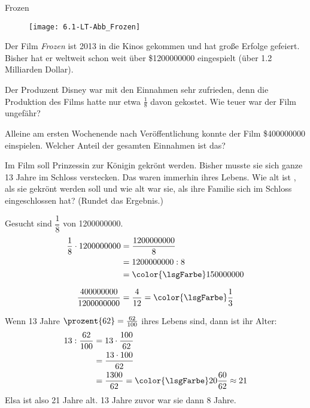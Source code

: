 \documentclass[12pt,a5paper,landscape]{scrartcl}
\def\clrLsg{\color{\lsgFarbe}}
\begin{document}
	\begin{karte3}[\symPartner]{Frozen}
		\begin{wrapfigure}[11]{r}{0pt}
			\texttt{[image: 6.1-LT-Abb\_Frozen]}
		\end{wrapfigure}
		
		Der Film \emph{Frozen} ist 2013 in die Kinos gekommen und hat große Erfolge gefeiert.
		Bisher hat er weltweit schon weit über \$\num{1200000000} eingespielt (über \num{1,2} Milliarden Dollar).
		
		\begin{enumeratea}\small
			\item Der Produzent Disney war mit den Einnahmen sehr zufrieden, denn die Produktion des Films hatte nur etwa $\tfrac{1}{8}$ davon gekostet. Wie teuer war der Film ungefähr?
			
			\item Alleine am ersten Wochenende nach Veröffentlichung konnte der Film \$\num{400000000} einspielen. Welcher Anteil der gesamten Einnahmen ist das?
			
			\item Im Film soll Prinzessin  zur Königin gekrönt werden. Bisher musste sie sich ganze \num{13} Jahre im Schloss verstecken. Das waren immerhin  ihres Lebens. Wie alt ist , als sie gekrönt werden soll und wie alt war sie, als ihre Familie sich im Schloss eingeschlossen hat? (Rundet das Ergebnis.)
		\end{enumeratea}
		
	\end{karte3}
	
	\begin{loesungskarte}
		\begin{multicols}{2}
		\begin{enumeratea}
			\item Gesucht sind $\dfrac{1}{8}$ von \num{1200000000}.
			\begin{align*}
				\frac{1}{8}\cdot 1200000000 &= \frac{1200000000}{8} \\
					&= 1200000000 : 8 \\
					&= \clrLsg 150000000
			\end{align*}
			
			\item
			\[ \frac{400000000}{1200000000} = \frac{4}{12} = \clrLsg\frac{1}{3} \]
			
			\item Wenn \num{13} Jahre $\prozent{62} = \tfrac{62}{100}$ ihres Lebens sind, dann ist ihr Alter:
			\begin{align*}
				13: \frac{62}{100} &= 13\cdot \frac{100}{62} \\
					&= \frac{13\cdot 100}{62} \\
					&= \frac{1300}{62} = \clrLsg 20\frac{60}{62}\approx 21
			\end{align*}
			Elsa ist also \num{21} Jahre alt. \num{13} Jahre zuvor war sie dann \num{8} Jahre.
		\end{enumeratea}
		\end{multicols}
	\end{loesungskarte}
	
\end{document}
